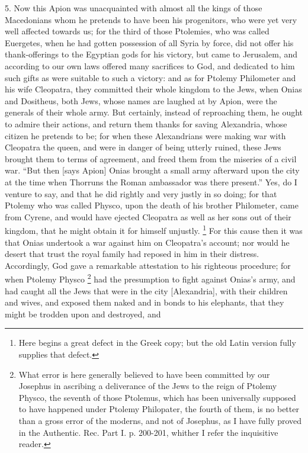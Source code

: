 5. Now this Apion was unacquainted with almost all the kings of those
Macedonians whom he pretends to have been his progenitors, who were yet
very well affected towards us; for the third of those Ptolemies, who was
called Euergetes, when he had gotten possession of all Syria by force, did
not offer his thank-offerings to the Egyptian gods for his victory, but
came to Jerusalem, and according to our own laws offered many sacrifices
to God, and dedicated to him such gifts as were suitable to such a
victory: and as for Ptolemy Philometer and his wife Cleopatra, they
committed their whole kingdom to the Jews, when Onias and Dositheus, both
Jews, whose names are laughed at by Apion, were the generals of their
whole army. But certainly, instead of reproaching them, he ought to admire
their actions, and return them thanks for saving Alexandria, whose citizen
he pretends to be; for when these Alexandrians were making war with
Cleopatra the queen, and were in danger of being utterly ruined, these
Jews brought them to terms of agreement, and freed them from the miseries
of a civil war. ``But then [says Apion] Onias brought a small army
afterward upon the city at the time when Thorruns the Roman ambassador was
there present.'' Yes, do I venture to say, and that he did rightly and very
justly in so doing; for that Ptolemy who was called Physco, upon the death
of his brother Philometer, came from Cyrene, and would have ejected
Cleopatra as well as her sons out of their kingdom, that he might obtain
it for himself unjustly. \footnote{Here begins a great defect
in the Greek copy; but the old Latin version fully supplies that defect.} For this cause then it was that
Onias undertook a war against him on Cleopatra's account; nor would he
desert that trust the royal family had reposed in him in their distress.
Accordingly, God gave a remarkable attestation to his righteous procedure;
for when Ptolemy Physco \footnote{What error is here
generally believed to have been committed by our Josephus in ascribing a
deliverance of the Jews to the reign of Ptolemy Physco, the seventh of
those Ptolemus, which has been universally supposed to have happened under
Ptolemy Philopater, the fourth of them, is no better than a gross error of
the moderns, and not of Josephus, as I have fully proved in the Authentic.
Rec. Part I. p. 200-201, whither I refer the inquisitive reader.} had the presumption to fight
against Onias's army, and had caught all the Jews that were in the city
[Alexandria], with their children and wives, and exposed them naked and in
bonds to his elephants, that they might be trodden upon and destroyed, and
